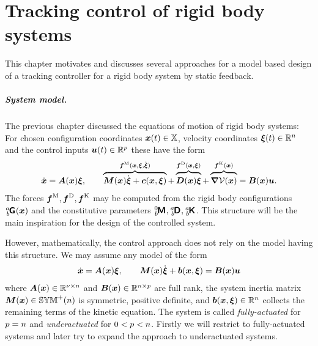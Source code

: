 \chapter{Tracking control of rigid body systems}\label{chap:Ctrl}
This chapter motivates and discusses several approaches for a model based design of a tracking controller for a rigid body system by static feedback.

\paragraph{System model.}
The previous chapter discussed the equations of motion of rigid body systems:
For chosen configuration coordinates $\boldsymbol{x}(t) \in \mathbb{X}$, velocity coordinates $\boldsymbol{\xi}(t) \in\mathbb{R}^{n}$ and the control inputs $\boldsymbol{u}(t)\in\mathbb{R}^{p}$ these have the form
\begin{align}\label{eq:CtrlSysMdl}
 \sysCoordd = \kinMat(\sysCoord) \sysVel, 
\qquad
 \overbrace{\sysInertiaMat(\sysCoord) \sysVeld + \gyroForce(\sysCoord, \sysVel)}^{\genForceInertia(\sysCoord, \sysVel, \sysVeld)} + \overbrace{\sysDissMat(\sysCoord)\sysVel\vphantom{\sysVeld}}^{\genForceDiss(\sysCoord, \sysVel)} + \overbrace{\differential\potentialEnergy(\sysCoord)\vphantom{\sysVeld}}^{\genForceStiff(\sysCoord)} = \sysInputMat(\sysCoord) \sysInput.
\end{align}
The forces $\boldsymbol{f}^{\mathrm{M}}, \boldsymbol{f}^{\mathrm{D}}, \boldsymbol{f}^{\mathrm{K}}$ may be computed from the rigid body configurations $\bodyHomoCoord{\BidxI}{\BidxII}(\sysCoord)$ and the constitutive parameters $\bodyInertiaMat{0}{\BidxII}, \bodyDissMat{\BidxI}{\BidxII}, \bodyStiffMat{\BidxI}{\BidxII}$.
This structure will be the main inspiration for the design of the controlled system.

However, mathematically, the control approach does not rely on the model having this structure.
We may assume any model of the form 
\begin{align}\label{eq:CtrlSysMdl2}
 \dot{\boldsymbol{x}} = \boldsymbol{A}(\boldsymbol{x}) \boldsymbol{\xi}, 
\qquad
 \boldsymbol{M}(\boldsymbol{x}) \dot{\boldsymbol{\xi}} + \boldsymbol{b}(\boldsymbol{x},\boldsymbol{\xi}) = \boldsymbol{B}(\boldsymbol{x})\boldsymbol{u}
\end{align}
where $\boldsymbol{A}(\boldsymbol{x}) \in \mathbb{R}^{\nu\times n}$ and $\boldsymbol{B}(\boldsymbol{x}) \in \mathbb{R}^{n\times p}$ are full rank, the system inertia matrix $\boldsymbol{M}(\boldsymbol{x}) \in \mathbb{SYM}^{+}(n)$ is symmetric, positive definite, and $\boldsymbol{b}(\boldsymbol{x}, \boldsymbol{\xi}) \in \mathbb{R}^{n}$ collects the remaining terms of the kinetic equation.
The system is called \textit{fully-actuated} for $p = n$ and \textit{underactuated} for $0 < p < n$.
Firstly we will restrict to fully-actuated systems and later try to expand the approach to underactuated systems.

